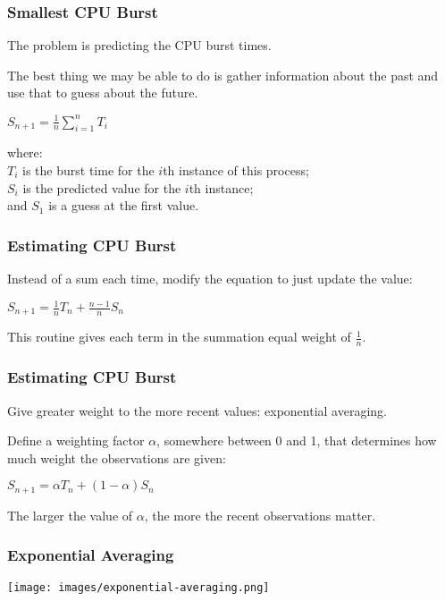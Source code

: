 \begin{frame}
\frametitle{Smallest CPU Burst}

The problem is predicting the CPU burst times. 

The best thing we may be able to do is gather information about the past and use that to guess about the future. 

\begin{center}
$S_{n+1} = \frac{1}{n}\displaystyle\sum_{i=1}^{n}T_{i}$
\end{center}

where:\\
\quad $T_{i}$ is the burst time for the $i$th instance of this process;\\
\quad $S_{i}$ is the predicted value for the $i$th instance; \\
\quad and $S_{1}$ is a guess at the first value.

\end{frame}

\begin{frame}
\frametitle{Estimating CPU Burst}

Instead of a sum each time, modify the equation to just update the value:

\begin{center}
$S_{n+1} = \frac{1}{n}T_{n} + \frac{n - 1}{n} S_{n}$
\end{center}

This routine gives each term in the summation equal weight of $\frac{1}{n}$. 

\end{frame}


\begin{frame}
\frametitle{Estimating CPU Burst}

Give greater weight to the more recent values: exponential averaging. 

Define a weighting factor $\alpha$, somewhere between 0 and 1, that determines how much weight the observations are given:

\begin{center}
$S_{n+1} = \alpha T_{n} + (1 - \alpha) S_{n}$
\end{center}

The larger the value of $\alpha$, the more the recent observations matter.

\end{frame}

\begin{frame}
\frametitle{Exponential Averaging}

\begin{center}
	\texttt{[image: images/exponential-averaging.png]}
\end{center}

\end{frame}

